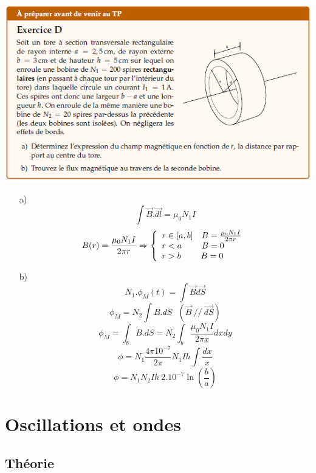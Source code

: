 \documentclass	[11pt, a4paper, openany]{book}
\begin{document}
\newpage
\begin{center}
\includegraphics[scale=1]{prepa/exoD.png}\\
\end{center}
\begin{itemize}
\item[a) ] 
$$\int \vec{B}.\vec{dl} = \mu_0 N_1I$$
$$B(r) = \frac{\mu_0 N_1I}{2\pi r}
\Rightarrow \left\{\begin{array}{l}
r \in [a,b] \ \ \  B = \frac{\mu_0 N_1I}{2\pi r}\\
r < a\ \ \ \ \ \ \ B = 0\\
r > b\ \ \ \ \ \ \ B = 0\end{array}\right.\\$$


\item[b) ]
$$N_1. \phi_M(t) = \int \vec{B}\vec{dS}$$
$$\phi_M = N_2 \int B.dS\ \ \ (\vec{B}\ //\ \vec{dS})$$
$$\phi_M = \int_b B.dS = N_2 \int_b \frac{\mu_0 N_1 I}{2\pi x} dxdy$$
$$\phi = N_1 \frac{4\pi 10^{-7}}{2\pi}N_1 I h \int \frac{dx}{x}$$
$$\phi = N_1 N_2 I h\ 2.10^{-7}\ln\left(\frac{b}{a}\right)$$
\end{itemize}


\newpage
\section{Oscillations et ondes}
	\subsection{Théorie}

\end{document}

